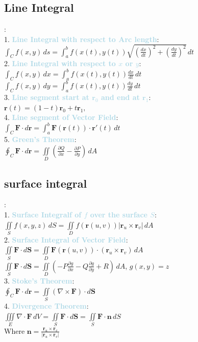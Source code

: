 \documentclass[twocolumn]{article}
\newcommand{\method}[1]{\textbf{\textcolor{lightblue}{#1}}}
\begin{document}
\subsection{Line Integral}
:\\
1. \method{\textbf{Line Integral with respect to Arc length}}:\\
 $\int_C f(x, y) \, ds = \int_a^b f(x(t), y(t)) 
\sqrt{\left( \frac{dx}{dt} \right)^2 + \left( \frac{dy}{dt} \right)^2} \, dt$\\
2. \method{\textbf{Line Integral with respect to $x$ or $y$}}:\\
$\int_C f(x, y) \, dx = \int_a^b f(x(t), y(t)) \frac{dx}{dt} \, dt$\\
$\int_C f(x, y) \, dy = \int_a^b f(x(t), y(t)) \frac{dy}{dt} \, dt$\\
3. \method{\textbf{Line segment start at $\mathbf{r}_{0}$ and end at $\mathbf{r}_{1}$}}:\\
$\mathbf{r}(t) = (1 - t)\mathbf{r}_{0} + t\mathbf{r}_{1}, $\\
4. \method{\textbf{Line segment of Vector Field}}:\\
$\int_C \mathbf{F} \cdot d\mathbf{r} = \int_a^b \mathbf{F}(\mathbf{r}(t)) \cdot \mathbf{r}'(t) \, dt$\\
5. \method{\textbf{Green's Theorem}}:\\
$\oint_C \mathbf{F} \cdot d\mathbf{r} = \iint\limits_D \left( \frac{\partial Q}{\partial x} - \frac{\partial P}{\partial y} \right) \, dA$

\subsection{surface integral}
:\\
1. \method{\textbf{Surface Integralf of $f$ over the surface $S$}}:\\
$\iint\limits_S f(x, y, z) \, dS = \iint\limits_D f(\mathbf{r}(u, v)) 
\left| \mathbf{r}_u \times \mathbf{r}_v \right| \, dA
$\\
2. \method{\textbf{Surface Integral of Vector Field}}:\\
$\iint\limits_S \mathbf{F} \cdot d\mathbf{S} = \iint\limits_D \mathbf{F}(\mathbf{r}(u, v)) \cdot (\mathbf{r}_u \times \mathbf{r}_v) \, dA$\\
$\iint\limits_S \mathbf{F} \cdot d\mathbf{S} = \iint\limits_D \left( -P \frac{\partial g}{\partial x} - Q \frac{\partial g}{\partial y} + R \right) \, dA$, $g(x,y) = z$\\
3. \method{\textbf{Stoke's Theorem}}:\\
$\oint_C \mathbf{F} \cdot d\mathbf{r} = \iint\limits_S \left( \nabla \times \mathbf{F} \right) \cdot d\mathbf{S}$\\
4. \method{\textbf{Divergence Theorem}}:\\
$\iiint\limits_E \nabla \cdot \mathbf{F} \, dV = \iint\limits_S \mathbf{F} \cdot d\mathbf{S} = \iint\limits_S \mathbf{F} \cdot \mathbf{n} \, dS $\\
Where $\mathbf{n} = \frac{\mathbf{r}_u \times \mathbf{r}_v}{|\mathbf{r}_u \times \mathbf{r}_v|}$
\end{document}
